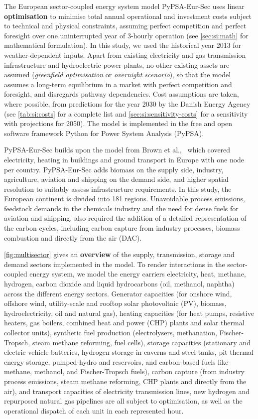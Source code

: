 The European sector-coupled energy system model PyPSA-Eur-Sec uses linear
\textbf{optimisation} to minimise total annual operational and investment costs
subject to technical and physical constraints, assuming perfect competition and
perfect foresight over one uninterrupted year of 3-hourly operation (see
\cref{sec:si:math} for mathematical formulation). In this study, we used the
historical year 2013 for weather-dependent inputs. Apart from existing
electricity and gas transmission infrastructure and hydroelectric power plants,
no other existing assets are assumed (\textit{greenfield optimisation} or
\textit{overnight scenario}), so that the model assumes a long-term equilibrium
in a market with perfect competition and foresight, and disregards pathway
dependencies. Cost assumptions are taken, where possible, from predictions for
the year 2030 by the Danish Energy Agency (see \cref{tab:si:costs} for a
complete list and \cref{sec:si:sensitivity-costs} for a sensitivity with
projections for 2050).\cite{DEA} The model is implemented in the free and open
software framework Python for Power System Analysis
(PyPSA).\cite{brownPyPSAPython2018}

PyPSA-Eur-Sec builds upon the model from Brown et
al.,~\cite{brownSynergiesSector2018} which covered electricity, heating in
buildings and ground transport in Europe with one node per country.
PyPSA-Eur-Sec adds biomass on the supply side, industry, agriculture, aviation
and shipping on the demand side, and higher spatial resolution to suitably
assess infrastructure requirements. In this study, the European continent is
divided into 181 regions. Unavoidable process emissions, feedstock demands in
the chemicals industry and the need for dense fuels for aviation and shipping,
also required the addition of a detailed representation of the carbon cycles,
including carbon capture from industry processes, biomass combustion and
directly from the air (DAC).

\cref{fig:multisector} gives an \textbf{overview} of the supply, transmission,
storage and demand sectors implemented in the model. To render interactions in
the sector-coupled energy system, we model the energy carriers electricity,
heat, methane, hydrogen, carbon dioxide and liquid hydrocarbons (oil, methanol,
naphtha) across the different energy sectors. Generator capacities (for onshore
wind, offshore wind, utility-scale and rooftop solar photovoltaic (PV), biomass,
hydroelectricity, oil and natural gas), heating capacities (for heat pumps,
resistive heaters, gas boilers, combined heat and power (CHP) plants and solar
thermal collector units), synthetic fuel production (electrolysers, methanation,
Fischer-Tropsch, steam methane reforming, fuel cells), storage capacities
(stationary and electric vehicle batteries, hydrogen storage in caverns and
steel tanks, pit thermal energy storage, pumped-hydro and reservoirs, and
carbon-based fuels like methane, methanol, and Fischer-Tropsch fuels), carbon
capture (from industry process emissions, steam methane reforming, CHP plants
and directly from the air), and transport capacities of electricity transmission
lines, new hydrogen and repurposed natural gas pipelines are all subject to
optimisation, as well as the operational dispatch of each unit in each
represented hour.

